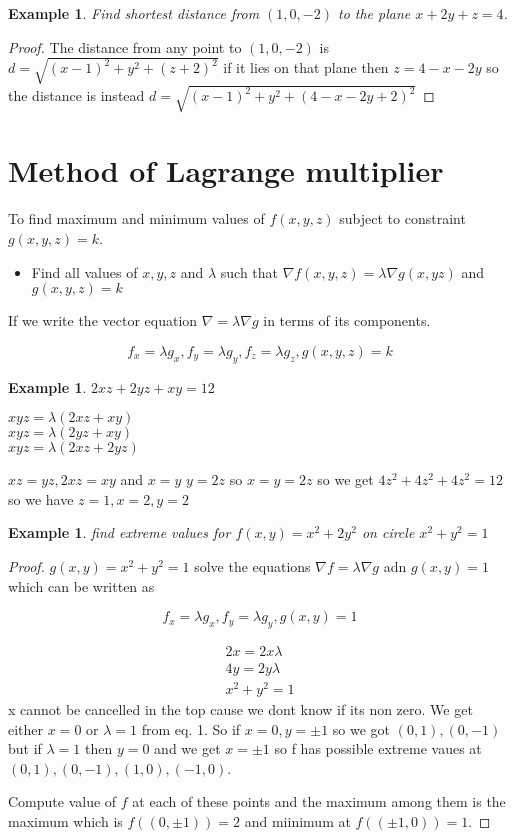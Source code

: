 \documentclass[oneside,11pt,pdftex]{book}%
\numberwithin{equation}{section}
\newtheorem{example}[theorem]{Example}
\numberwithin{section}{chapter}
\numberwithin{equation}{chapter}
\begin{document}
\begin{example}
	Find shortest distance from $ (1,0,-2) $ to the plane $ x+2y+z=4 $.
\end{example}
\begin{proof}
	The distance from any point to $ (1,0,-2) $ is $ d=\sqrt{(x-1)^2+y^2+(z+2)^2} $ if it lies on that plane then $ z=4-x-2y $ so the distance is instead $ d=\sqrt{(x-1)^2+y^2+(4-x-2y+2)^2} $
\end{proof}

\section{Method of Lagrange multiplier}
To find maximum and minimum values of $ f(x,y,z) $ subject to constraint $ g(x,y,z)=k $.
\begin{itemize}
	\item Find all values of $ x,y,z $ and $ \lambda  $ such that $ \nabla f(x,y,z)=\lambda \nabla g(x,yz)$ and $ g(x,y,z)=k $
\end{itemize}

If we write the vector equation $ \nabla=\lambda \nabla g $ in terms of its components.

\[ f_x=\lambda g_x, f_y=\lambda g_y, f_z=\lambda g_z, g(x,y,z)=k \]

\begin{example}
	$ 2xz+2yz+xy=12 $
\end{example}
$ xyz=\lambda(2xz+xy) $\\
$ xyz=\lambda(2yz+xy) $\\
$ xyz=\lambda (2xz+2yz) $

$ xz=yz, 2xz=xy $ and $ x=y $ $ y=2z $ so $ x=y=2z $ so we get $ 4z^2+4z^2+4z^2=12 $ so we have $ z=1,x=2,y=2 $

\begin{example}
	find extreme values for $ f(x,y) =x^2+2y^2$ on circle $ x^2+y^2=1 $
\end{example}
\begin{proof}
	$ g(x,y)=x^2+y^2=1 $ solve the equations $ \nabla f= \lambda \nabla g $ adn $ g(x,y)=1 $ which can be written as 
	
	\[ f_x=\lambda g_x, f_y=\lambda g_y, g(x,y)=1 \]
	
	\begin{align*}
		2x=2x\lambda\\
		4y=2y\lambda\\
		x^2+y^2=1
	\end{align*}
x cannot be cancelled in the top cause we dont know if its non zero. We get either $ x=0 $ or $ \lambda=1 $ from eq. 1. So if $ x=0,y=\pm1  $ so we got $ (0,1), (0,-1)$ but if $ \lambda=1 $ then $ y=0 $ and we get $ x=\pm 1 $ so f has possible extreme vaues at $ (0,1) , (0,-1),(1,0),(-1,0)$.

Compute value of $ f  $ at each of these points and the maximum among them is the maximum which is $ f((0,\pm1))=2 $ and miinimum at $ f((\pm1, 0)) =1$.
\end{proof}
\end{document}
